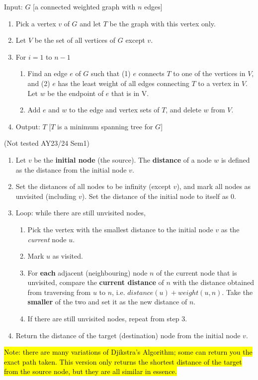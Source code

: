 \documentclass{article}
\begin{document}
\begin{description}
\begin{enumerate}
    \end{enumerate}
    \item[\ding{73} Prim's Algorithm for MST] Input: $G$ [a connected weighted graph with $n$ edges]
    \begin{enumerate}
    	\item Pick a vertex $v$ of $G$ and let $T$ be the graph with this vertex only.
		\item Let $V$ be the set of all vertices of $G$ except $v$.
		\item For $i = 1$ to $n - 1$
		\begin{enumerate}
			\item Find an edge $e$ of $G$ such that (1) $e$ connects $T$ to one of the vertices in $V$, and (2) $e$ has the least weight of all edges connecting $T$ to a vertex in $V$. Let $w$ be the endpoint of $e$ that is in V.
			\item Add $e$ and $w$ to the edge and vertex sets of $T$, and delete $w$ from $V$.
		\end{enumerate}
		\item Output: $T$ [$T$ is a minimum spanning tree for $G$]
    \end{enumerate}
    \item[Djikstra's Algorithm for shortest path] (Not tested AY23/24 Sem1) 
    \begin{enumerate}
    	\item Let $v$ be the \textbf{initial node} (the source). The \textbf{distance} of a node $w$ is defined as the distance from the initial node $v$. 
		\item Set the distances of all nodes to be infinity (except $v$), and mark all nodes as unvisited (including $v$). Set the distance of the initial node to itself as 0. 
		\item Loop: while there are still unvisited nodes, 
		\begin{enumerate}
			\item Pick the vertex with the smallest distance to the initial node $v$ as the \emph{current} node $u$. 
			\item Mark $u$ as visited. 
			\item For \textbf{each} adjacent (neighbouring) node $n$ of the current node that is unvisited, compare the \textbf{current distance} of $n$ with the distance obtained from traversing from $u$ to $n$, i.e. $distance(u) + weight(u, n)$. Take the \textbf{smaller} of the two and set it as the new distance of $n$. 
			\item If there are still unvisited nodes, repeat from step 3. 
		\end{enumerate} 
		\item Return the distance of the target (destination) node from the initial node $v$.
    \end{enumerate}
    \item \hl{Note: there are many variations of Djikstra's Algorithm; some can return you the exact path taken. This version only returns the shortest distance of the target from the source node, but they are all similar in essence.}
    
	
\end{description}
\end{document}
